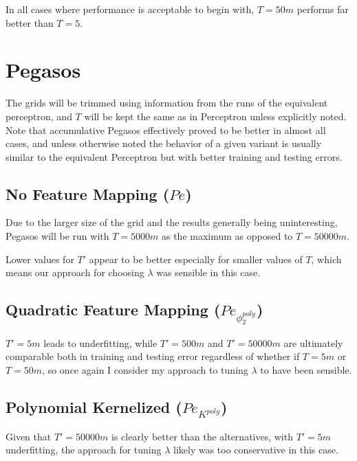 In all cases where performance is acceptable to begin with, $T = 50m$ performs far better than $T = 5$.



\pagebreak{}

\section{Pegasos}
The grids will be trimmed using information from the runs of the equivalent perceptron, and $T$ will be kept the same as in Perceptron unless explicitly noted.
Note that accumulative Pegasos effectively proved to be better in almost all cases, and unless otherwise noted the behavior of a given variant is usually similar to the equivalent Perceptron but with better training and testing errors.

\pagebreak{}
\subsection{No Feature Mapping  ($Pe$)}
Due to the larger size of the grid and the results generally being uninteresting, Pegasos will be run with $T = 5000m$ as the maximum as opposed to $T = 50000m$.

Lower values for $T'$ appear to be better especially for smaller values of $T$, which means our approach for choosing $\lambda{}$ was sensible in this case.



\pagebreak{}
\subsection{Quadratic Feature Mapping ($Pe_{\phi{}^{poly}_2}$)}
$T' = 5m$ leads to underfitting, while $T' = 500m$ and $T' = 50000m$ are ultimately comparable both in training and testing error regardless of whether if $T = 5m$ or $T = 50m$, so once again I consider my approach to tuning $\lambda{}$ to have been sensible.



\pagebreak{}
\subsection{Polynomial Kernelized ($Pe_{K^{poly}}$)}
Given that $T' = 50000m$ is clearly better than the alternatives, with $T' = 5m$ underfitting, the approach for tuning $\lambda{}$ likely was too conservative in this case.

